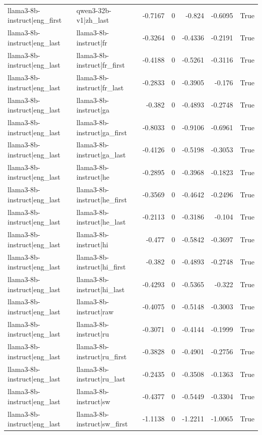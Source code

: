 \begin{table}
\begin{tabular}{l l r r r r l}
llama3-8b-instruct|eng_first & qwen3-32b-v1|zh_last & -0.7167 & 0 & -0.824 & -0.6095 & True \\
llama3-8b-instruct|eng_last & llama3-8b-instruct|fr & -0.3264 & 0 & -0.4336 & -0.2191 & True \\
llama3-8b-instruct|eng_last & llama3-8b-instruct|fr_first & -0.4188 & 0 & -0.5261 & -0.3116 & True \\
llama3-8b-instruct|eng_last & llama3-8b-instruct|fr_last & -0.2833 & 0 & -0.3905 & -0.176 & True \\
llama3-8b-instruct|eng_last & llama3-8b-instruct|ga & -0.382 & 0 & -0.4893 & -0.2748 & True \\
llama3-8b-instruct|eng_last & llama3-8b-instruct|ga_first & -0.8033 & 0 & -0.9106 & -0.6961 & True \\
llama3-8b-instruct|eng_last & llama3-8b-instruct|ga_last & -0.4126 & 0 & -0.5198 & -0.3053 & True \\
llama3-8b-instruct|eng_last & llama3-8b-instruct|he & -0.2895 & 0 & -0.3968 & -0.1823 & True \\
llama3-8b-instruct|eng_last & llama3-8b-instruct|he_first & -0.3569 & 0 & -0.4642 & -0.2496 & True \\
llama3-8b-instruct|eng_last & llama3-8b-instruct|he_last & -0.2113 & 0 & -0.3186 & -0.104 & True \\
llama3-8b-instruct|eng_last & llama3-8b-instruct|hi & -0.477 & 0 & -0.5842 & -0.3697 & True \\
llama3-8b-instruct|eng_last & llama3-8b-instruct|hi_first & -0.382 & 0 & -0.4893 & -0.2748 & True \\
llama3-8b-instruct|eng_last & llama3-8b-instruct|hi_last & -0.4293 & 0 & -0.5365 & -0.322 & True \\
llama3-8b-instruct|eng_last & llama3-8b-instruct|raw & -0.4075 & 0 & -0.5148 & -0.3003 & True \\
llama3-8b-instruct|eng_last & llama3-8b-instruct|ru & -0.3071 & 0 & -0.4144 & -0.1999 & True \\
llama3-8b-instruct|eng_last & llama3-8b-instruct|ru_first & -0.3828 & 0 & -0.4901 & -0.2756 & True \\
llama3-8b-instruct|eng_last & llama3-8b-instruct|ru_last & -0.2435 & 0 & -0.3508 & -0.1363 & True \\
llama3-8b-instruct|eng_last & llama3-8b-instruct|sw & -0.4377 & 0 & -0.5449 & -0.3304 & True \\
llama3-8b-instruct|eng_last & llama3-8b-instruct|sw_first & -1.1138 & 0 & -1.2211 & -1.0065 & True \\

\end{tabular}
\end{table}
